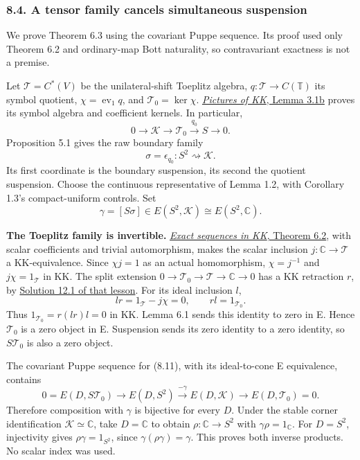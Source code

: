 \documentclass[
  11pt,
]{article}
\begin{document}
\subsubsection{8.4. A tensor family cancels simultaneous
suspension}\label{a-tensor-family-cancels-simultaneous-suspension}

We prove Theorem 6.3 using the covariant Puppe sequence. Its proof used
only Theorem 6.2 and ordinary-map Bott naturality, so contravariant
exactness is not a premise.

Let \(\mathcal T=C^*(V)\) be the unilateral-shift Toeplitz algebra,
\(q:\mathcal T\to C(\mathbb T)\) its symbol quotient,
\(\chi=\operatorname{ev}_1q\), and \(\mathcal T_0=\ker\chi\).
\href{KT-KK-07.html\#projection-lifts-and-the-exponential-boundary}{\emph{Pictures
of KK}, Lemma 3.1b} proves its symbol algebra and coefficient kernels.
In particular, \[
0\longrightarrow\mathcal K\longrightarrow\mathcal T_0
\xrightarrow{q_0}S\longrightarrow0.
\tag{8.11}
\] Proposition 5.1 gives the raw boundary family \[
\sigma=\epsilon_{q_0}:S^2\rightsquigarrow\mathcal K.
\tag{8.12}
\] Its first coordinate is the boundary suspension, its second the
quotient suspension. Choose the continuous representative of Lemma 1.2,
with Corollary 1.3's compact-uniform controls. Set \[
\gamma=[S\sigma]\in E(S^2,\mathcal K)
\cong E(S^2,\mathbb C).
\tag{8.13}
\]

\textbf{The Toeplitz family is invertible.}
\href{KT-KK-14.html\#6-the-generalized-toeplitz-algebra}{\emph{Exact
sequences in KK}, Theorem 6.2}, with scalar coefficients and trivial
automorphism, makes the scalar inclusion \(j:\mathbb C\to\mathcal T\) a
KK-equivalence. Since \(\chi j=1\) as an actual homomorphism,
\(\chi=j^{-1}\) and \(j\chi=1_{\mathcal T}\) in KK. The split extension
\(0\to\mathcal T_0\to\mathcal T\to\mathbb C\to0\) has a KK retraction
\(r\), by \href{KT-KK-14.html\#13-solutions}{Solution 12.1 of that
lesson}. For its ideal inclusion \(l\), \[
lr=1_{\mathcal T}-j\chi=0,\qquad rl=1_{\mathcal T_0}.
\] Thus \(1_{\mathcal T_0}=r(lr)l=0\) in KK. Lemma 6.1 sends this
identity to zero in E. Hence \(\mathcal T_0\) is a zero object in E.
Suspension sends its zero identity to a zero identity, so
\(S\mathcal T_0\) is also a zero object.

The covariant Puppe sequence for (8.11), with its ideal-to-cone E
equivalence, contains \[
0=E(D,S\mathcal T_0)\longrightarrow E(D,S^2)
\xrightarrow{-\gamma}E(D,\mathcal K)
\longrightarrow E(D,\mathcal T_0)=0.
\tag{8.14}
\] Therefore composition with \(\gamma\) is bijective for every \(D\).
Under the stable corner identification \(\mathcal K\simeq\mathbb C\),
take \(D=\mathbb C\) to obtain \(\rho:\mathbb C\to S^2\) with
\(\gamma\rho=1_{\mathbb C}\). For \(D=S^2\), injectivity gives
\(\rho\gamma=1_{S^2}\), since \(\gamma(\rho\gamma)=\gamma\). This proves
both inverse products. No scalar index was used.
\end{document}
